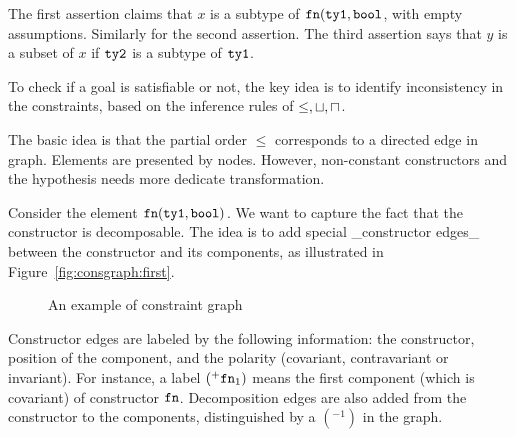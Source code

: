 The first assertion claims that $x$ is a subtype of $\mathtt{fn} (\mathtt{ty1},
\mathtt{bool}$, with empty assumptions. Similarly for the second assertion. The
third assertion says that $y$ is a subset of $x$ if $\mathtt{ty2}$ is a subtype of
$\mathtt{ty1}$.

To check if a goal is satisfiable or not, the key idea is to identify
inconsistency in the constraints, based on the inference rules of $\leq, \sqcup,
\sqcap$.

The basic idea is that the partial order $\leq$ corresponds to a directed edge
in graph. Elements are presented by nodes. However, non-constant constructors
and the hypothesis needs more dedicate transformation.

Consider the element $\mathtt{fn} (\mathtt{ty1}, \mathtt{bool})$. We want to capture the fact
that the constructor is decomposable. The idea is to add special _constructor
edges_ between the constructor and its components, as illustrated in
Figure~\ref{fig:consgraph:first}.

\begin{figure}
\begin{center}
%
\end{center}
\caption{An example of constraint graph}
\label{fig:consgraph}
\end{figure}

Constructor edges are labeled by the following information: the constructor,
position of the component, and the polarity (covariant, contravariant or
invariant). For instance, a label $(^{+}\mathtt{fn}_1)$ means the first
component (which is covariant) of constructor $\mathtt{fn}$.
%
Decomposition edges are also added from the constructor to the components,
distinguished by a $(^{-1})$ in the graph.

